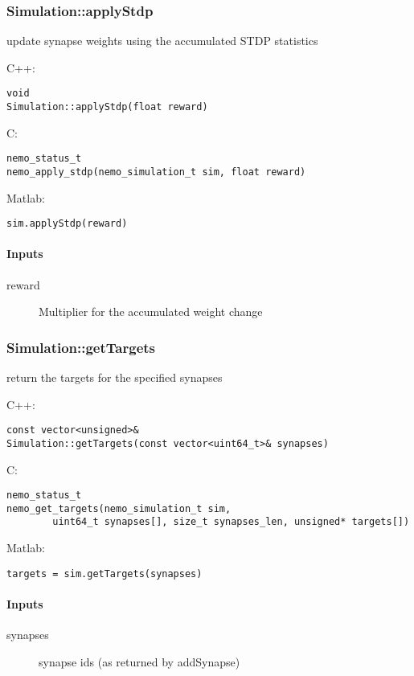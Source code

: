 \clearpage
\subsubsection*{Simulation::applyStdp}
\label{fn: applyStdp}
update synapse weights using the accumulated STDP statistics


\noindent C++:
\begin{lstlisting}[aboveskip=2pt]
void
Simulation::applyStdp(float reward)
\end{lstlisting}

\noindent C:
\begin{lstlisting}[aboveskip=2pt]
nemo_status_t
nemo_apply_stdp(nemo_simulation_t sim, float reward)
\end{lstlisting}

\noindent Matlab:
\begin{lstlisting}[aboveskip=2pt]
sim.applyStdp(reward)
\end{lstlisting}
\paragraph{Inputs}
\begin{description}
\item[reward] Multiplier for the accumulated weight change
\end{description}

\clearpage
\subsubsection*{Simulation::getTargets}
\label{fn: getTargets}
return the targets for the specified synapses


\noindent C++:
\begin{lstlisting}[aboveskip=2pt]
const vector<unsigned>&
Simulation::getTargets(const vector<uint64_t>& synapses)
\end{lstlisting}

\noindent C:
\begin{lstlisting}[aboveskip=2pt]
nemo_status_t
nemo_get_targets(nemo_simulation_t sim, 
        uint64_t synapses[], size_t synapses_len, unsigned* targets[])
\end{lstlisting}

\noindent Matlab:
\begin{lstlisting}[aboveskip=2pt]
targets = sim.getTargets(synapses)
\end{lstlisting}
\paragraph{Inputs}
\begin{description}
\item[synapses] synapse ids (as returned by addSynapse)
\end{description}
